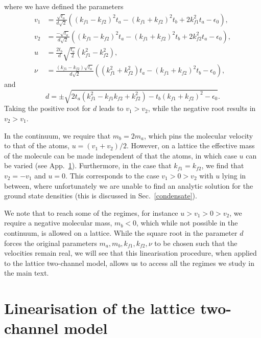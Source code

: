 \documentclass[aps,pra,
superscriptaddress,
reprint,twocolumn,preprintnumbers,
amsmath,amssymb,
nofootinbib]{revtex4-1}
\begin{document}
where we have defined the parameters
		\begin{align}
		v_1 & = \frac{\sqrt{t_a}}{d \sqrt{2}} \left( (k_{f1} - k_{f2})^2 t_a - (k_{f1} + k_{f2})^2 t_b + 2 k_{f1}^2 t_a - \epsilon_0 \right) ,\nonumber \\
		v_2 & = \frac{-\sqrt{t_a}}{d \sqrt{2}} \left( (k_{f1} - k_{f2})^2 t_a - (k_{f1} + k_{f2})^2 t_b + 2 k_{f2}^2 t_a - \epsilon_0 \right) ,\nonumber \\
		u & = \frac{2 t_b}{d} \sqrt{\frac{t_a}{2}} \left(k_{f1}^2 - k_{f2}^2 \right) ,\nonumber \\
		\nu & =  \frac{(k_{f1} - k_{f2})\sqrt{t_a}}{d\sqrt{2}} \left( (k_{f1}^2 + k_{f2}^2)t_a - (k_{f1} + k_{f2})^2 t_b - \epsilon_0\right) ,
		\end{align}
and
		\begin{equation}
		d = \pm \sqrt{2 t_a \left(k_{f1}^2 - k_{f1} k_{f2} + k_{f2}^2\right) - t_b (k_{f1} + k_{f2})^2 -\epsilon_0} .
		\end{equation}				
Taking the positive root for $d$ leads to $v_1 > v_2$, while the negative root results in $v_2 > v_1$.

In the continuum, we require that $m_b = 2 m_a$, which pins the molecular velocity to that of the atoms, $u = (v_1  + v_2)/2$. However, on a lattice the effective mass of the molecule can be made independent of that the atoms, in which case $u$ can be varied (see App.~\ref{app:C}). Furthermore, in the case that $k_{f1} = k_{f2}$, we find that $v_2 = - v_1$ and $u = 0$. This corresponds to the case $v_1>0>v_2$ with $u$ lying in between, where unfortunately we are unable to find an analytic solution for the ground state densities (this is discussed in Sec.~\ref{condensate}).

We note that to reach some of the regimes, for instance $u>v_1>0>v_2$, we require a negative molecular mass, $m_b < 0$, which while not possible in the continuum, is allowed on a lattice. While the square root in the parameter $d$ forces the original parameters $m_a, m_b, k_{f1}, k_{f2}, \nu$ to be chosen such that the velocities remain real, we will see that this linearisation procedure, when applied to the lattice two-channel model, allows us to access all the regimes we study in the main text.

  
	\section{Linearisation of the lattice two-channel model}
	\label{app:C}
	
\end{document}
